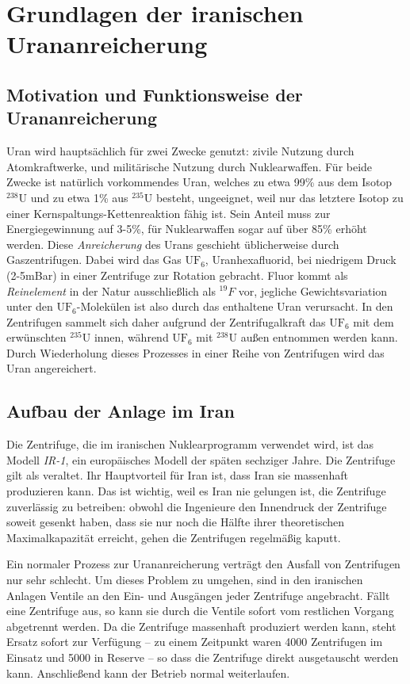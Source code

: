 \documentclass[a4paper]{article}
\begin{document}
\section{Grundlagen der iranischen Urananreicherung}

\subsection{Motivation und Funktionsweise der Urananreicherung}

Uran wird hauptsächlich für zwei Zwecke genutzt: zivile Nutzung durch Atomkraftwerke, und militärische Nutzung durch Nuklearwaffen.
Für beide Zwecke ist natürlich vorkommendes Uran,
welches zu etwa 99\% aus dem Isotop $^{238}\mathrm U$ und zu etwa 1\% aus $^{235}\mathrm U$ besteht, ungeeignet,
weil nur das letztere Isotop zu einer Kernspaltungs-Kettenreaktion fähig ist.
Sein Anteil muss zur Energiegewinnung auf 3-5\%, für Nuklearwaffen sogar auf über 85\% erhöht werden.
Diese \emph{Anreicherung} des Urans geschieht üblicherweise durch Gaszentrifugen.
Dabei wird das Gas $\mathrm{UF}_6$, Uranhexafluorid, bei niedrigem Druck (2-5mBar) in einer Zentrifuge zur Rotation gebracht.
Fluor kommt als \emph{Reinelement} in der Natur ausschließlich als $^{19}F$ vor,
jegliche Gewichtsvariation unter den $\mathrm{UF}_6$-Molekülen ist also durch das enthaltene Uran verursacht.
In den Zentrifugen sammelt sich daher aufgrund der Zentrifugalkraft das $\mathrm{UF}_6$ mit dem erwünschten $^{235}\mathrm U$ innen,
während $\mathrm{UF}_6$ mit $^{238}\mathrm U$ außen entnommen werden kann.
Durch Wiederholung dieses Prozesses in einer Reihe von Zentrifugen wird das Uran angereichert.\cite{wiki:urananreicherung}

\subsection{Aufbau der Anlage im Iran}

Die Zentrifuge, die im iranischen Nuklearprogramm verwendet wird, ist das Modell \emph{IR-1}, ein europäisches Modell der späten sechziger Jahre.
Die Zentrifuge gilt als veraltet. Ihr Hauptvorteil für Iran ist, dass Iran sie massenhaft produzieren kann.
Das ist wichtig, weil es Iran nie gelungen ist, die Zentrifuge zuverlässig zu betreiben:
obwohl die Ingenieure den Innendruck der Zentrifuge soweit gesenkt haben, dass sie nur noch die Hälfte ihrer theoretischen Maximalkapazität erreicht,
gehen die Zentrifugen regelmäßig kaputt.

Ein normaler Prozess zur Urananreicherung verträgt den Ausfall von Zentrifugen nur sehr schlecht.
Um dieses Problem zu umgehen, sind in den iranischen Anlagen Ventile an den Ein- und Ausgängen jeder Zentrifuge angebracht.
Fällt eine Zentrifuge aus, so kann sie durch die Ventile sofort vom restlichen Vorgang abgetrennt werden.
Da die Zentrifuge massenhaft produziert werden kann, steht Ersatz sofort zur Verfügung
– zu einem Zeitpunkt waren 4000 Zentrifugen im Einsatz und 5000 in Reserve\cite{tkac} – %
so dass die Zentrifuge direkt ausgetauscht werden kann.
Anschließend kann der Betrieb normal weiterlaufen.
\end{document}
